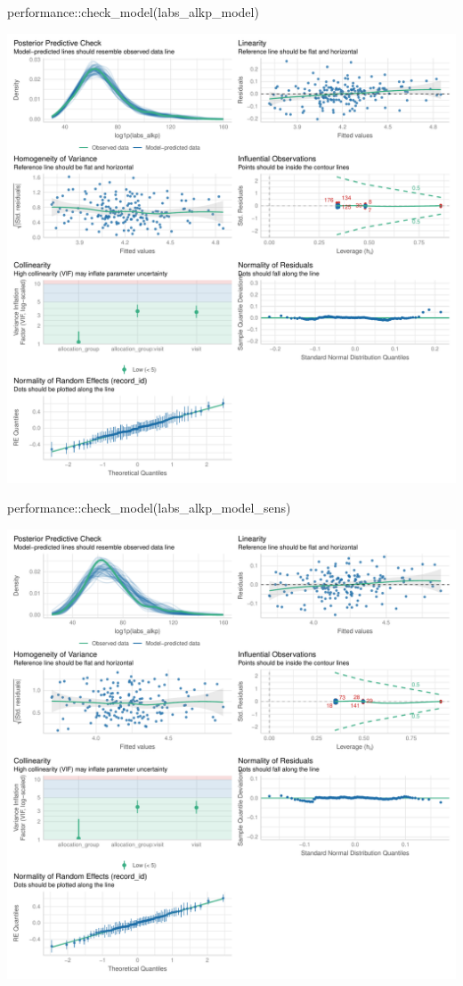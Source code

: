 \documentclass[
  12pt,
]{article}
\newenvironment{Shaded}{\begin{snugshade}}{\end{snugshade}}
\newcommand{\FunctionTok}[1]{\textcolor[rgb]{0.28,0.35,0.67}{#1}}
\newcommand{\NormalTok}[1]{\textcolor[rgb]{0.00,0.23,0.31}{#1}}
\newcommand{\SpecialCharTok}[1]{\textcolor[rgb]{0.37,0.37,0.37}{#1}}
\begin{document}
\begin{Shaded}
\begin{Highlighting}[]
\NormalTok{performance}\SpecialCharTok{::}\FunctionTok{check\_model}\NormalTok{(labs\_alkp\_model)}
\end{Highlighting}
\end{Shaded}

\includegraphics{Outcomes_files/figure-pdf/labs_alkp_4-1.pdf}

\begin{Shaded}
\begin{Highlighting}[]
\NormalTok{performance}\SpecialCharTok{::}\FunctionTok{check\_model}\NormalTok{(labs\_alkp\_model\_sens)}
\end{Highlighting}
\end{Shaded}

\includegraphics{Outcomes_files/figure-pdf/labs_alkp_4-2.pdf}
\end{document}
